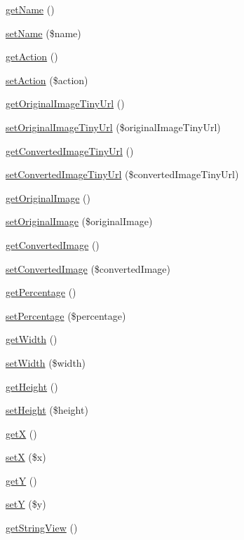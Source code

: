 \begin{DoxyCompactItemize}
\item 
\hyperlink{class_image_a3d0963e68bb313b163a73f2803c64600}{get\+Name} ()
\item 
\hyperlink{class_image_a2fe666694997d047711d7653eca2f132}{set\+Name} (\$name)
\item 
\hyperlink{class_image_a189a4abe5faf11f4320d5d3f1d3d1715}{get\+Action} ()
\item 
\hyperlink{class_image_a0366b3b0db0bd90abfc461c372f86599}{set\+Action} (\$action)
\item 
\hyperlink{class_image_aab00ef1f3d7195f7a96525fa256693e8}{get\+Original\+Image\+Tiny\+Url} ()
\item 
\hyperlink{class_image_a7e494a5296542ce9a3b630b44e00d34c}{set\+Original\+Image\+Tiny\+Url} (\$original\+Image\+Tiny\+Url)
\item 
\hyperlink{class_image_aa014ef3404caa4b2851ac8abe3839fc5}{get\+Converted\+Image\+Tiny\+Url} ()
\item 
\hyperlink{class_image_a7728a3c9d97504a2d4395c2b3b07a846}{set\+Converted\+Image\+Tiny\+Url} (\$converted\+Image\+Tiny\+Url)
\item 
\hyperlink{class_image_aa04ac0ed8e055aec654707828f9f3027}{get\+Original\+Image} ()
\item 
\hyperlink{class_image_a03b1465c1775d2bf36adf3f64f5ca2b8}{set\+Original\+Image} (\$original\+Image)
\item 
\hyperlink{class_image_a03c12d5555bd83f7d11f34237c325423}{get\+Converted\+Image} ()
\item 
\hyperlink{class_image_a0c086f4fa6b16585bf9e69c069e1dfea}{set\+Converted\+Image} (\$converted\+Image)
\item 
\hyperlink{class_image_af21a3a8612cb807b040a8a4bc11e2ca1}{get\+Percentage} ()
\item 
\hyperlink{class_image_a6ef303afe964acda9688f3343bc1becc}{set\+Percentage} (\$percentage)
\item 
\hyperlink{class_image_ae7fba4c8be1972cf80dc1a95f390df23}{get\+Width} ()
\item 
\hyperlink{class_image_adb2ef71e95464b35945ff9f67e4d6e44}{set\+Width} (\$width)
\item 
\hyperlink{class_image_aa725283ffc599b3f6563cada4cbeb2c7}{get\+Height} ()
\item 
\hyperlink{class_image_a3b5739cc2b9bb1c260893bbb3228e87a}{set\+Height} (\$height)
\item 
\hyperlink{class_image_a403d7c3dc9b308567cf859a67b1cf1e5}{get\+X} ()
\item 
\hyperlink{class_image_a301469d59d809fb9557830ec5e53788f}{set\+X} (\$x)
\item 
\hyperlink{class_image_ac878fc1b93b7d5c1bd6d3142dd197f19}{get\+Y} ()
\item 
\hyperlink{class_image_a60c81cdca58fb705cb647608fc803aa5}{set\+Y} (\$y)
\item 
\hyperlink{class_image_a4d5198c3929ebdaa2e71d41bb529d70b}{get\+String\+View} ()
\end{DoxyCompactItemize}
